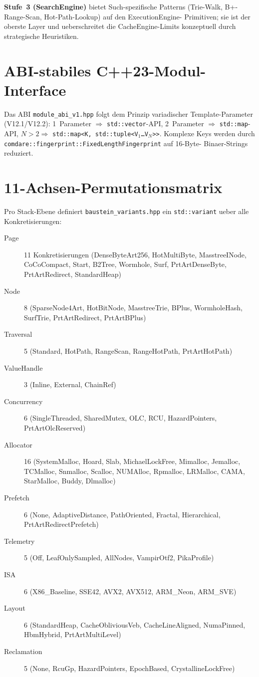 \textbf{Stufe~3 (SearchEngine)} bietet Such-spezifische Patterns
(Trie-Walk, B+-Range-Scan, Hot-Path-Lookup) auf den ExecutionEngine-
Primitiven; sie ist der oberste Layer und ueberschreitet die
CacheEngine-Limits konzeptuell durch strategische Heuristiken.

\section{ABI-stabiles C++23-Modul-Interface}

Das ABI \texttt{module\_abi\_v1.hpp} folgt dem Prinzip variadischer
Template-Parameter (V12.1/V12.2): 1~Parameter $\Rightarrow$
\texttt{std::vector}-API, 2~Parameter $\Rightarrow$ \texttt{std::map}-API,
$N>2 \Rightarrow$ \texttt{std::map<K, std::tuple<V$_1$\ldots V$_N$>>}.
Komplexe Keys werden durch
\texttt{comdare::fingerprint::FixedLengthFingerprint} auf 16-Byte-
Binaer-Strings reduziert.

\section{11-Achsen-Permutationsmatrix}

Pro Stack-Ebene definiert \texttt{baustein\_variants.hpp} ein
\texttt{std::variant} ueber alle Konkretisierungen:

\begin{description}
    \item[Page] 11 Konkretisierungen (DenseByteArt256, HotMultiByte,
        MasstreeINode, CoCoCompact, Start, B2Tree, Wormhole, Surf,
        PrtArtDenseByte, PrtArtRedirect, StandardHeap)
    \item[Node] 8 (SparseNode4Art, HotBitNode, MasstreeTrie, BPlus,
        WormholeHash, SurfTrie, PrtArtRedirect, PrtArtBPlus)
    \item[Traversal] 5 (Standard, HotPath, RangeScan, RangeHotPath,
        PrtArtHotPath)
    \item[ValueHandle] 3 (Inline, External, ChainRef)
    \item[Concurrency] 6 (SingleThreaded, SharedMutex, OLC, RCU,
        HazardPointers, PrtArtOlcReserved)
    \item[Allocator] 16 (SystemMalloc, Hoard, Slab, MichaelLockFree,
        Mimalloc, Jemalloc, TCMalloc, Snmalloc, Scalloc, NUMAlloc,
        Rpmalloc, LRMalloc, CAMA, StarMalloc, Buddy, Dlmalloc)
    \item[Prefetch] 6 (None, AdaptiveDistance, PathOriented, Fractal,
        Hierarchical, PrtArtRedirectPrefetch)
    \item[Telemetry] 5 (Off, LeafOnlySampled, AllNodes, VampirOtf2,
        PikaProfile)
    \item[ISA] 6 (X86\_Baseline, SSE42, AVX2, AVX512, ARM\_Neon, ARM\_SVE)
    \item[Layout] 6 (StandardHeap, CacheObliviousVeb, CacheLineAligned,
        NumaPinned, HbmHybrid, PrtArtMultiLevel)
    \item[Reclamation] 5 (None, RcuGp, HazardPointers, EpochBased,
        CrystallineLockFree)
\end{description}

